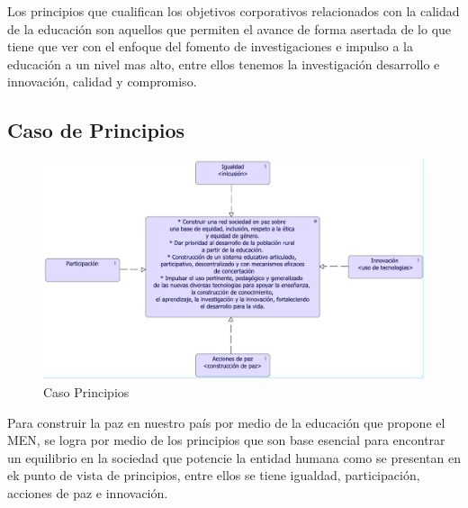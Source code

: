 Los principios que cualifican los objetivos corporativos relacionados con la calidad de la educación son aquellos que permiten el avance de forma asertada de lo que tiene que ver con el enfoque del fomento de investigaciones e impulso a la educación a un nivel mas alto, entre ellos tenemos la investigación desarrollo e innovación, calidad y compromiso.


\subsection{Caso  de Principios}
\begin{figure}[h]
	\centering
	\includegraphics[width=1.0\linewidth]{imgs/motivacion/principios/principios_2}
	\caption{Caso Principios}
\end{figure}

Para construir la paz en nuestro país por medio de la educación que propone el MEN, se logra por medio de los principios que son base esencial para encontrar un equilibrio en la sociedad que potencie la entidad humana como se presentan en ek punto de vista de principios, entre ellos se tiene igualdad, participación, acciones de paz e innovación.